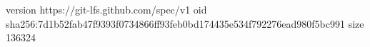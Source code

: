 version https://git-lfs.github.com/spec/v1
oid sha256:7d1b52fab47f9393f0734866ff93feb0bd174435e534f792276ead980f5bc991
size 136324
